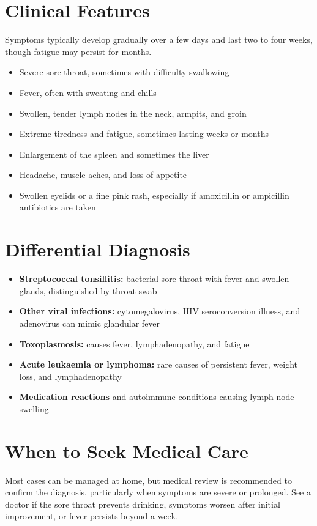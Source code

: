 \section*{Clinical Features}
Symptoms typically develop gradually over a few days and last two to four weeks, though fatigue may persist for months.
\begin{itemize}
    \item Severe sore throat, sometimes with difficulty swallowing
    \item Fever, often with sweating and chills
    \item Swollen, tender lymph nodes in the neck, armpits, and groin
    \item Extreme tiredness and fatigue, sometimes lasting weeks or months
    \item Enlargement of the spleen and sometimes the liver
    \item Headache, muscle aches, and loss of appetite
    \item Swollen eyelids or a fine pink rash, especially if amoxicillin or ampicillin antibiotics are taken
\end{itemize}

\section*{Differential Diagnosis}
\begin{itemize}
    \item \textbf{Streptococcal tonsillitis:} bacterial sore throat with fever and swollen glands, distinguished by throat swab
    \item \textbf{Other viral infections:} cytomegalovirus, HIV seroconversion illness, and adenovirus can mimic glandular fever
    \item \textbf{Toxoplasmosis:} causes fever, lymphadenopathy, and fatigue
    \item \textbf{Acute leukaemia or lymphoma:} rare causes of persistent fever, weight loss, and lymphadenopathy
    \item \textbf{Medication reactions} and autoimmune conditions causing lymph node swelling
\end{itemize}

\section*{When to Seek Medical Care}
Most cases can be managed at home, but medical review is recommended to confirm the diagnosis, particularly when symptoms are severe or prolonged. See a doctor if the sore throat prevents drinking, symptoms worsen after initial improvement, or fever persists beyond a week.

